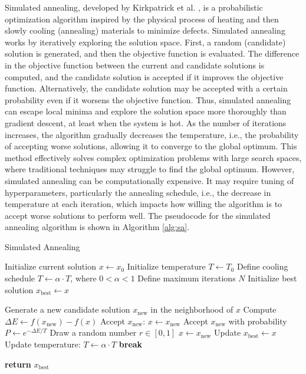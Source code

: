 \documentclass{article}[11pt]
\begin{document}
Simulated annealing, developed by Kirkpatrick et al. \cite{Kirkpatrick:1983aa}, is a probabilistic optimization algorithm inspired by the physical process of 
heating and then slowly cooling (annealing) materials to minimize defects.
Simulated annealing works by iteratively exploring the solution space. First, a random (candidate) solution is generated, and then the objective function is evaluated.
The difference in the objective function between the current and candidate solutions is computed, and the candidate solution is accepted if it improves the objective function.
Alternatively, the candidate solution may be accepted with a certain probability even if it worsens the objective function. 
Thus, simulated annealing can escape local minima and explore the solution space more thoroughly than gradient descent, at least when the system is hot.
As the number of iterations increases, the algorithm gradually decreases the temperature, i.e., the probability of accepting worse solutions, allowing it to converge to the global optimum.
This method effectively solves complex optimization problems with large search spaces, where traditional techniques may struggle to find the global optimum.
However, simulated annealing can be computationally expensive. It may require tuning of hyperparameters, particularly the annealing schedule, i.e., the decrease in temperature at each iteration, which impacts how willing the algorithm is to accept worse solutions to perform well. 
The pseudocode for the simulated annealing algorithm is shown in Algorithm \ref{alg:sa}.
\begin{algorithm}[H]
\caption{Simulated Annealing}\label{alg:sa}
\begin{algorithmic}[1]
\State Initialize current solution $x \gets x_0$
\State Initialize temperature $T \gets T_0$
\State Define cooling schedule $T \gets \alpha \cdot T$, where $0 < \alpha < 1$
\State Define maximum iterations $N$
\State Initialize best solution $x_\text{best} \gets x$

    \State Generate a new candidate solution $x_\text{new}$ in the neighborhood of $x$
    \State Compute $\Delta E \gets f(x_\text{new}) - f(x)$
        \State Accept $x_\text{new}$: $x \gets x_\text{new}$
    \Else
        \State Accept $x_\text{new}$ with probability $P \gets e^{-\Delta E / T}$
        \State Draw a random number $r \in [0, 1]$
            \State $x \gets x_\text{new}$
        \EndIf
    \EndIf
        \State Update $x_\text{best} \gets x$
    \EndIf
    \State Update temperature: $T \gets \alpha \cdot T$
        \State \textbf{break}
    \EndIf
\EndFor

\State \textbf{return} $x_\text{best}$
\end{algorithmic}
\end{algorithm}
\end{document}
